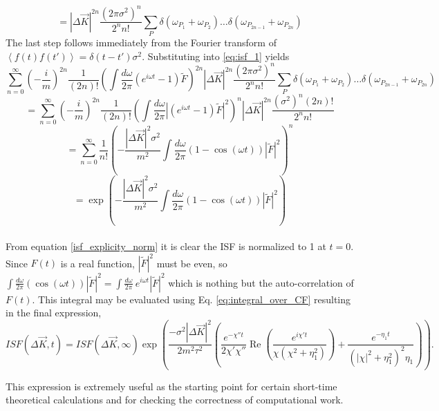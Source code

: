 \documentclass[7pt]{article}
\begin{document}
$$
= \left|\Delta \vec{K}\right|^{2n} \frac{\left(2\pi\sigma^2\right)^n}{2^nn!} \sum_P \delta\left(\omega_{P_1} + \omega_{P_2}\right) \ldots \delta\left(\omega_{P_{2n-1}} + \omega_{P_{2n}}\right)
$$
The last step follows immediately from the Fourier transform of $\left<f(t)f(t')\right>=\delta(t-t')\sigma^2$. Substituting into \ref{eq:isf_1} yields
$$
\sum_{n=0}^{\infty} \left(- \frac{i}{m}\right)^{2n} \frac{1}{(2n)!} \left( \int \frac{d\omega}{2\pi} \left(e^{i\omega t} - 1\right) \tilde{F}\right)^{2n} \left|\Delta \vec{K}\right|^{2n} \frac{\left(2\pi\sigma^2\right)^n}{2^nn!} \sum_P \delta\left(\omega_{P_1} + \omega_{P_2}\right) \ldots \delta\left(\omega_{P_{2n-1}} + \omega_{P_{2n}}\right)
$$
$$
= \sum_{n=0}^{\infty} \left(- \frac{i}{m}\right)^{2n} \frac{1}{(2n)!} \left( \int \frac{d\omega}{2\pi} \left|\left(e^{i\omega t} - 1\right) \tilde{F}\right|^2\right)^{n} \left|\Delta \vec{K}\right|^{2n} \frac{\left(\sigma^2\right)^n(2n)!}{2^nn!}
$$
$$
= \sum_{n=0}^{\infty} \frac{1}{n!} \left(-\frac{|\Delta \vec{K}|^2 \sigma^2}{m^2} \int \frac{d\omega}{2\pi}\left(1 - \cos\left(\omega t\right)\right) \left| \tilde{F} \right|^2\right)^n
$$
\begin{equation}
= \exp\left(-\frac{|\Delta \vec{K}|^2 \sigma^2}{m^2} \int \frac{d\omega}{2\pi}\left(1 - \cos\left(\omega t\right)\right) \left| \tilde{F} \right|^2\right) \label{isf_explicity_norm}
\end{equation}
\\
From equation \ref{isf_explicity_norm} it is clear the ISF is normalized to 1 at $t=0$. Since $F(t)$ is a real function, $|\tilde{F}|^2$ must be even, so $\int \frac{d\omega}{2\pi}\left(\cos\left(\omega t\right)\right) \left| \tilde{F} \right|^2 = \int \frac{d\omega}{2\pi}\ e^{i \omega t} \left| \tilde{F} \right|^2$ which is nothing but the auto-correlation of $F(t)$. This integral may be evaluated using Eq. \ref{eq:integral_over_CF} resulting in the final expression, 
\begin{equation}
	ISF\left(\Delta \vec{K}, t\right) = ISF\left(\Delta \vec{K}, \infty\right) \exp\left(\frac{-\sigma^2\left|\Delta \vec{K}\right|^2}{2m^2\tau^2}\left(\frac{e^{-\chi''t}}{2\chi'\chi''}\operatorname{Re}\left(\frac{e^{i\chi't}}{\chi\left(\chi^2+\eta_1^2\right)}\right) + \frac{e^{-\eta_1t}}{\left(\left|\chi\right|^2+\eta_1^2\right)^2\eta_1}\right)\right) \label{isf_exp}.
\end{equation}

This expression is extremely useful as the starting point for certain short-time theoretical calculations and for checking the correctness of computational work.
\end{document}
